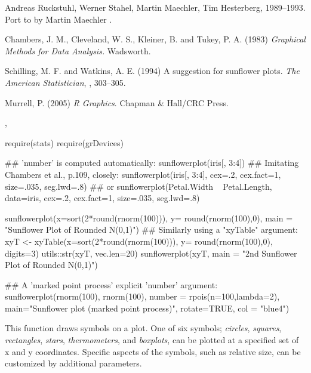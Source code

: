 %
\begin{Author}\relax
Andreas Ruckstuhl, Werner Stahel, Martin Maechler, Tim Hesterberg,
1989--1993.  Port to \R{} by Martin Maechler
.
\end{Author}
%
\begin{References}\relax
Chambers, J. M., Cleveland, W. S., Kleiner, B. and Tukey, P. A. (1983)
\emph{Graphical Methods for Data Analysis.}  Wadsworth.

Schilling, M. F. and Watkins, A. E. (1994)
A suggestion for sunflower plots.
\emph{The American Statistician}, , 303--305.

Murrell, P. (2005) \emph{R Graphics}. Chapman \& Hall/CRC Press.
\end{References}
%
\begin{SeeAlso}\relax
{}, 
\end{SeeAlso}
%
\begin{Examples}
\begin{ExampleCode}
require(stats)
require(grDevices)

## 'number' is computed automatically:
sunflowerplot(iris[, 3:4])
## Imitating  Chambers et al., p.109, closely:
sunflowerplot(iris[, 3:4], cex=.2, cex.fact=1, size=.035, seg.lwd=.8)
## or
sunflowerplot(Petal.Width ~ Petal.Length, data=iris,
              cex=.2, cex.fact=1, size=.035, seg.lwd=.8)


sunflowerplot(x=sort(2*round(rnorm(100))), y= round(rnorm(100),0),
              main = "Sunflower Plot of Rounded N(0,1)")
## Similarly using a "xyTable" argument:
xyT <- xyTable(x=sort(2*round(rnorm(100))), y= round(rnorm(100),0),
               digits=3)
utils::str(xyT, vec.len=20)
sunflowerplot(xyT, main = "2nd Sunflower Plot of Rounded N(0,1)")

## A 'marked point process' {explicit 'number' argument}:
sunflowerplot(rnorm(100), rnorm(100), number = rpois(n=100,lambda=2),
              main="Sunflower plot (marked point process)",
              rotate=TRUE, col = "blue4")
\end{ExampleCode}
\end{Examples}
%
\begin{Description}\relax
This function draws symbols on a plot.  One of six symbols;
\emph{circles}, \emph{squares}, \emph{rectangles}, \emph{stars},
\emph{thermometers}, and \emph{boxplots}, can be plotted at a
specified set of x and y coordinates.  Specific aspects of the
symbols, such as relative size, can be customized by additional
parameters.
\end{Description}
